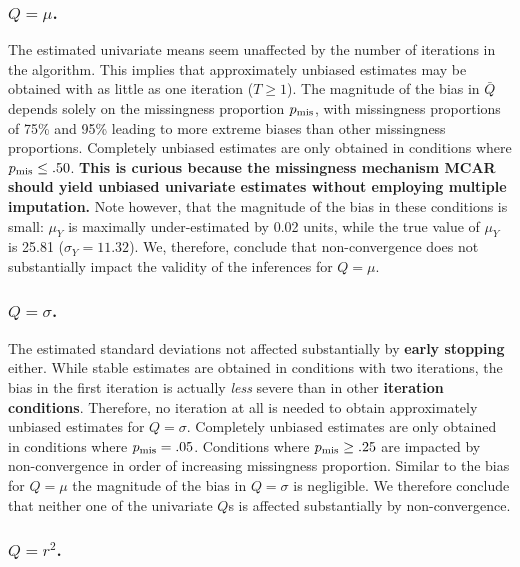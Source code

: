\documentclass[Royal,times,sageh]{sagej}
\begin{document}
\hypertarget{qmu.}{%
\subsubsection{\texorpdfstring{\(Q=\mu\).}{Q=\textbackslash mu.}}\label{qmu.}}

The estimated univariate means seem unaffected by the number of iterations in the algorithm. This implies that approximately unbiased estimates may be obtained with as little as one iteration (\(T \geq 1\)). The magnitude of the bias in \(\bar{Q}\) depends solely on the missingness proportion \(p_{\rm mis}\), with missingness proportions of 75\% and 95\% leading to more extreme biases than other missingness proportions. Completely unbiased estimates are only obtained in conditions where \(p_{\rm mis}\leq.50\). \textbf{This is curious because the missingness mechanism MCAR should yield unbiased univariate estimates without employing multiple imputation.} Note however, that the magnitude of the bias in these conditions is small: \(\mu_Y\) is maximally under-estimated by 0.02 units, while the true value of \(\mu_Y\) is 25.81 (\(\sigma_Y = 11.32\)). We, therefore, conclude that non-convergence does not substantially impact the validity of the inferences for \(Q=\mu\).

\hypertarget{qsigma.}{%
\subsubsection{\texorpdfstring{\(Q=\sigma\).}{Q=\textbackslash sigma.}}\label{qsigma.}}

The estimated standard deviations not affected substantially by \textbf{early stopping} either. While stable estimates are obtained in conditions with two iterations, the bias in the first iteration is actually \emph{less} severe than in other \textbf{iteration conditions}. Therefore, no iteration at all is needed to obtain approximately unbiased estimates for \(Q=\sigma\). Completely unbiased estimates are only obtained in conditions where \(p_{\rm mis}=.05\). Conditions where \(p_{\rm mis}\geq.25\) are impacted by non-convergence in order of increasing missingness proportion. Similar to the bias for \(Q=\mu\) the magnitude of the bias in \(Q=\sigma\) is negligible. We therefore conclude that neither one of the univariate \(Q\)s is affected substantially by non-convergence.

\hypertarget{qr2.}{%
\subsubsection{\texorpdfstring{\(Q=r^2\).}{Q=r\^{}2.}}\label{qr2.}}
\end{document}
